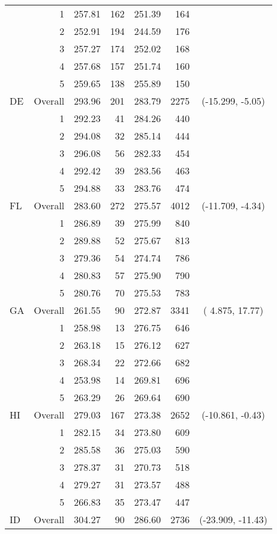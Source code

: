 \begin{longtable}{lrrr@{\extracolsep{.25cm}}rrc}
   & 1 & 257.81 & 162 & 251.39 & 164 &  \\ 
   & 2 & 252.91 & 194 & 244.59 & 176 &  \\ 
   & 3 & 257.27 & 174 & 252.02 & 168 &  \\ 
   & 4 & 257.68 & 157 & 251.74 & 160 &  \\ 
   & 5 & 259.65 & 138 & 255.89 & 150 &  \\ 
   \hline
DE & Overall & 293.96 & 201 & 283.79 & 2275 & (-15.299,  -5.05) \\ 
   & 1 & 292.23 &  41 & 284.26 & 440 &  \\ 
   & 2 & 294.08 &  32 & 285.14 & 444 &  \\ 
   & 3 & 296.08 &  56 & 282.33 & 454 &  \\ 
   & 4 & 292.42 &  39 & 283.56 & 463 &  \\ 
   & 5 & 294.88 &  33 & 283.76 & 474 &  \\ 
   \hline
FL & Overall & 283.60 & 272 & 275.57 & 4012 & (-11.709,  -4.34) \\ 
   & 1 & 286.89 &  39 & 275.99 & 840 &  \\ 
   & 2 & 289.88 &  52 & 275.67 & 813 &  \\ 
   & 3 & 279.36 &  54 & 274.74 & 786 &  \\ 
   & 4 & 280.83 &  57 & 275.90 & 790 &  \\ 
   & 5 & 280.76 &  70 & 275.53 & 783 &  \\ 
   \hline
GA & Overall & 261.55 &  90 & 272.87 & 3341 & (  4.875,  17.77) \\ 
   & 1 & 258.98 &  13 & 276.75 & 646 &  \\ 
   & 2 & 263.18 &  15 & 276.12 & 627 &  \\ 
   & 3 & 268.34 &  22 & 272.66 & 682 &  \\ 
   & 4 & 253.98 &  14 & 269.81 & 696 &  \\ 
   & 5 & 263.29 &  26 & 269.64 & 690 &  \\ 
   \hline
HI & Overall & 279.03 & 167 & 273.38 & 2652 & (-10.861,  -0.43) \\ 
   & 1 & 282.15 &  34 & 273.80 & 609 &  \\ 
   & 2 & 285.58 &  36 & 275.03 & 590 &  \\ 
   & 3 & 278.37 &  31 & 270.73 & 518 &  \\ 
   & 4 & 279.27 &  31 & 273.57 & 488 &  \\ 
   & 5 & 266.83 &  35 & 273.47 & 447 &  \\ 
   \hline
ID & Overall & 304.27 &  90 & 286.60 & 2736 & (-23.909, -11.43) \\ 

\end{longtable}
